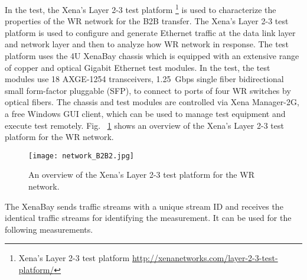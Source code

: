 In the test, the Xena's Layer 2-3 test platform \footnote{Xena's Layer 2-3 test platform \url{http://xenanetworks.com/layer-2-3-test-platform/}} is used to characterize the properties of the WR network for the B2B transfer. The Xena's Layer 2-3 test platform is used to configure and generate Ethernet traffic at the data link layer and network layer and then to analyze how WR network in response. The test platform uses the 4U XenaBay chassis which is equipped with an extensive range of copper and optical Gigabit Ethernet test modules. In the test, the test modules use 18 AXGE-1254 transceivers, \SI{1.25}{Gbps} single fiber bidirectional small form-factor pluggable (SFP), to connect to ports of four WR switches by optical fibers. The chassis and test modules are controlled via Xena Manager-2G, a free Windows GUI client, which can be used to manage test equipment and execute test remotely. Fig. ~\ref{network_B2B2} shows an overview of the Xena's Layer 2-3 test platform for the WR network.
\begin{figure}[H]
   \centering   
   \texttt{[image: network\_B2B2.jpg]}
   \caption{An overview of the Xena's Layer 2-3 test platform for the WR network.}
   \label{network_B2B2}
\end{figure}

The XenaBay sends traffic streams with a unique stream ID and receives the identical traffic streams for identifying the measurement. It can be used for the following measurements.

